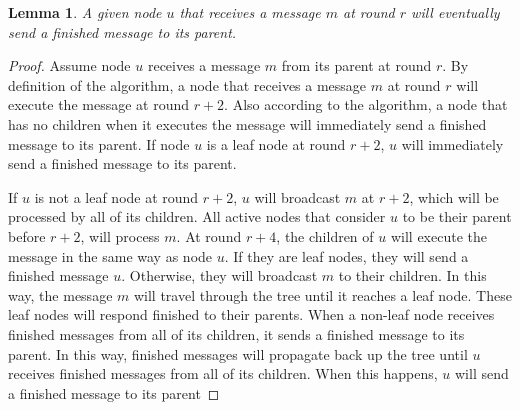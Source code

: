 \documentclass[english]{article}
\newtheorem{lemma}[theorem]{Lemma}
\begin{document}
\begin{lemma}
\label{StaggeredSpanningTreePropagation}
A given node $u$ that receives a message $m$ at round $r$ will eventually send a finished message to its parent. 
\end{lemma}
\begin{proof}

Assume node $u$ receives a message $m$ from its parent at round $r$. By definition of the algorithm, a node that receives a message $m$ at round $r$ will execute the message at round $r+2$. Also according to the algorithm, a node that has no children when it executes the message will immediately send a finished message to its parent. If node $u$ is a leaf node at round $r+2$, $u$ will immediately send a finished message to its parent.

If $u$ is not a leaf node at round $r+2$, $u$ will broadcast $m$ at $r+2$, which will be processed by all of its children. All active nodes that consider $u$ to be their parent before $r+2$, will process $m$. At round $r+4$, the children of $u$ will execute the message in the same way as node $u$. If they are leaf nodes, they will send a finished message $u$. Otherwise, they will broadcast $m$ to their children. In this way, the message $m$ will travel through the tree until it reaches a leaf node. These leaf nodes will respond finished to their parents. When a non-leaf node receives finished messages from all of its children, it sends a finished message to its parent. In this way, finished messages will propagate back up the tree until $u$ receives finished messages from all of its children. When this happens, $u$ will send a finished message to its parent




\end{proof}
\end{document}
